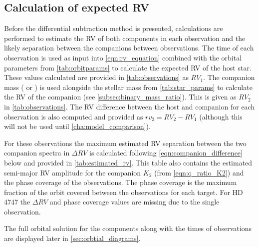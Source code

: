 
\subsection{Calculation of expected {RV}}

Before the differential subtraction method is presented, calculations are performed to estimate the {RV} of both components in each observation and the likely separation between the companions between observations.
The time of each observation is used as input into \cref{eqn:rv_equation} combined with the orbital parameters from \cref{tab:orbitparams} to calculate the expected {RV} of the host star.
These values calculated are provided in \cref{tab:observations} as \({RV}_{1}\).
The companion mass (\Mtwo{} or \Mtwosini{}) is used alongside the stellar mass from \cref{tab:star_params} to calculate the {RV} of the companion (see \cref{subsec:binary_mass_ratio}).
This is given as \({RV}_{2}\) in \cref{tab:observations}.
The {RV} difference between the host and companion for each observation is also computed and provided as \({rv}_{2} = {RV}_{2}-{RV}_{1}\) (although this will not be used until \cref{cha:model_comparison}).

For these observations the maximum estimated {RV} separation between the two companion spectra in \(\Delta {RV}\) is calculated following \cref{eqn:companion_difference} below and provided in \cref{tab:estimated_rv}.
This table also contains the estimated semi-major {RV} amplitude for the companion \(K_2\) (from \cref{eqn:q_ratio_K2}) and the phase coverage of the observations.
The phase coverage is the maximum fraction of the orbit covered between the observations for each target.
For {HD\,4747} the \(\Delta {RV}\) and phase coverage values are missing due to the single observation.




The full orbital solution for the components along with the times of observations are displayed later in \cref{sec:orbtial_diagrams}.


